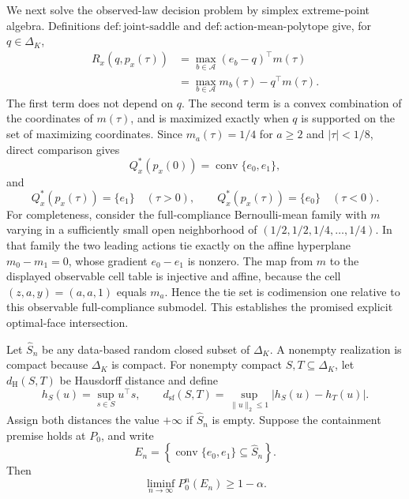 We next solve the observed-law decision problem by simplex extreme-point algebra.  Definitions \(\mathrm{def{:}joint\text{-}saddle}\) and \(\mathrm{def{:}action\text{-}mean\text{-}polytope}\) give, for \(q\in\Delta_K\),
\[
 \begin{aligned}
 R_x(q,p_x(\tau))
 &=\max_{b\in\mathcal A}(e_b-q)^\top m(\tau)\\
 &=\max_{b\in\mathcal A}m_b(\tau)-q^\top m(\tau).
 \end{aligned}
\]
The first term does not depend on \(q\).  The second term is a convex combination of the coordinates of \(m(\tau)\), and is maximized exactly when \(q\) is supported on the set of maximizing coordinates.  Since \(m_a(\tau)=1/4\) for \(a\geq2\) and \(|\tau|<1/8\), direct comparison gives
\[
 Q_x^*(p_x(0))=\operatorname{conv}\{e_0,e_1\},
\]
and
\[
 Q_x^*(p_x(\tau))=\{e_1\}\quad(\tau>0),
 \qquad
 Q_x^*(p_x(\tau))=\{e_0\}\quad(\tau<0).
\]
For completeness, consider the full-compliance Bernoulli-mean family with \(m\) varying in a sufficiently small open neighborhood of \((1/2,1/2,1/4,\ldots,1/4)\).  In that family the two leading actions tie exactly on the affine hyperplane \(m_0-m_1=0\), whose gradient \(e_0-e_1\) is nonzero.  The map from \(m\) to the displayed observable cell table is injective and affine, because the cell \((z,a,y)=(a,a,1)\) equals \(m_a\).  Hence the tie set is codimension one relative to this observable full-compliance submodel.  This establishes the promised explicit optimal-face intersection.

Let \(\widehat S_n\) be any data-based random closed subset of \(\Delta_K\).  A nonempty realization is compact because \(\Delta_K\) is compact.  For nonempty compact \(S,T\subseteq\Delta_K\), let \(d_{\mathrm H}(S,T)\) be Hausdorff distance and define
\[
 h_S(u)=\sup_{s\in S}u^\top s,
 \qquad
 d_{\mathrm{sf}}(S,T)
 =\sup_{\lVert u\rVert_2\leq1}|h_S(u)-h_T(u)|.
\]
Assign both distances the value \(+\infty\) if \(\widehat S_n\) is empty.  Suppose the containment premise holds at \(P_0\), and write
\[
 E_n=\left\{\operatorname{conv}\{e_0,e_1\}\subseteq\widehat S_n\right\}.
\]
Then
\[
 \liminf_{n\to\infty}P_0^n(E_n)\geq1-\alpha.
\]

